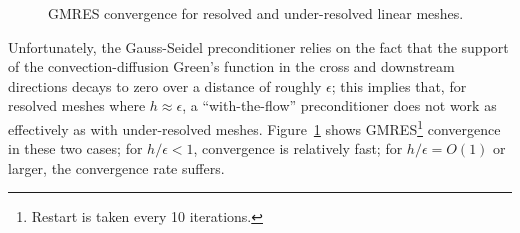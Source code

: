 \documentclass[final,leqno]{siamltex}
\begin{document}
\begin{figure}
\caption{GMRES convergence for resolved and under-resolved linear meshes.}
\label{fig:resolved_GS}
\end{figure}

Unfortunately, the Gauss-Seidel preconditioner relies on the fact that the support of the convection-diffusion Green's function in the cross and downstream directions decays to zero over a distance of roughly $\epsilon$; this implies that, for resolved meshes where $h\approx \epsilon$, a ``with-the-flow'' preconditioner does not work as effectively as with under-resolved meshes.  Figure~\ref{fig:resolved_GS} shows GMRES\footnote{Restart is taken every 10 iterations.} convergence in these two cases; for $h/\epsilon < 1$, convergence is relatively fast; for $h/\epsilon = O(1)$ or larger, the convergence rate suffers.  
\end{document}
